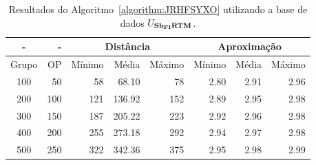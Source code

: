 \begin{table}[!htb]
  \caption{Resultados do Algoritmo~\ref{algorithm:JRHFSYXO} utilizando a base de dados $U_{\textbf{Sb\textsubscript{FI}RTM}}{}$.}
  \label{table:NKDEXOVQ}
  \centering
  \begin{tabular}{|c|r|r|r|r|r|r|r|}
    \hline
      -      &  -   & \multicolumn{3}{c|}{Distância}             & \multicolumn{3}{c|}{Aproximação}           \\ \hline
    Grupo    & OP   & Mínimo       & Média        & Máximo       & Mínimo       & Média        & Máximo       \\ \hline  
    100      & 50   & 58           &  68.10       &  78          & 2.80         & 2.91         & 2.96         \\ \hline
    200      & 100  & 121          & 136.92       & 152          & 2.89         & 2.95         & 2.98         \\ \hline
    300      & 150  & 187          & 205.22       & 223          & 2.92         & 2.96         & 2.98         \\ \hline
    400      & 200  & 255          & 273.18       & 292          & 2.94         & 2.97         & 2.98         \\ \hline
    500      & 250  & 322          & 342.36       & 375          & 2.95         & 2.98         & 2.99         \\ \hline    
  \end{tabular}
\end{table}